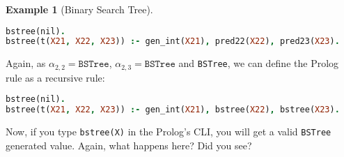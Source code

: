 \documentclass{report}
\theoremstyle{definition}
\newtheorem{example}{Example}[section]
\theoremstyle{definition}
\newcommand{\ttt}[1]{\texttt{#1}}
\begin{document}
\begin{example}[Binary Search Tree]
\begin{lstlisting}[language=Prolog]
bstree(nil).																														%% rule 1
bstree(t(X21, X22, X23)) :- gen_int(X21), pred22(X22), pred23(X23).			%% rule 2
\end{lstlisting}
Again, as $\alpha_{2,2} = \ttt{BSTree}$, $\alpha_{2,3} = \ttt{BSTree}$ and \ttt{BSTree}, we can define the Prolog rule as a recursive rule:\\
\begin{lstlisting}[language=Prolog]
bstree(nil).																														%% rule 1
bstree(t(X21, X22, X23)) :- gen_int(X21), bstree(X22), bstree(X23).			%% rule 2
\end{lstlisting}
Now, if you type \ttt{bstree(X)} in the Prolog's CLI, you will get a valid \ttt{BSTree} generated value. Again, what happens here? Did you see?
\end{example}
\end{document}
